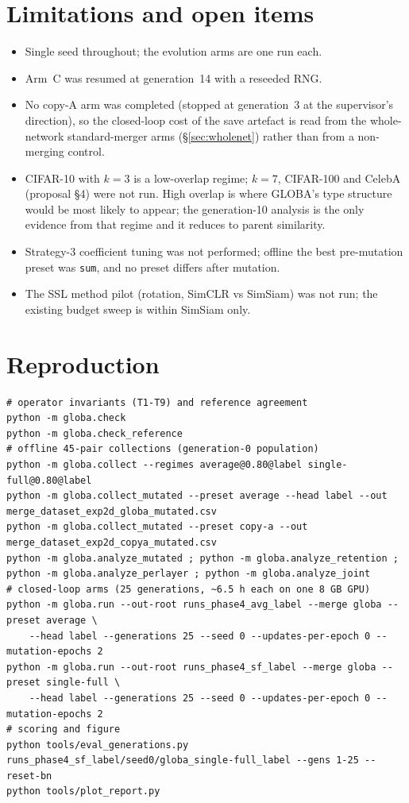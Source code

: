 \documentclass[11pt,a4paper]{article}
\newcommand{\code}[1]{\texttt{#1}}
\begin{document}
\section{Limitations and open items}
\begin{itemize}[nosep]
\item Single seed throughout; the evolution arms are one run each.
\item Arm~C was resumed at generation~14 with a reseeded RNG.
\item No copy-A arm was completed (stopped at generation~3 at the supervisor's direction), so the closed-loop cost of the save artefact is read from the whole-network standard-merger arms (\S\ref{sec:wholenet}) rather than from a non-merging control.
\item CIFAR-10 with $k=3$ is a low-overlap regime; $k=7$, CIFAR-100 and CelebA (proposal \S4) were not run. High overlap is where GLOBA's type structure would be most likely to appear; the generation-10 analysis is the only evidence from that regime and it reduces to parent similarity.
\item Strategy-3 coefficient tuning was not performed; offline the best pre-mutation preset was \code{sum}, and no preset differs after mutation.
\item The SSL method pilot (rotation, SimCLR vs SimSiam) was not run; the existing budget sweep is within SimSiam only.
\end{itemize}

\section{Reproduction}
\begin{lstlisting}
# operator invariants (T1-T9) and reference agreement
python -m globa.check
python -m globa.check_reference
# offline 45-pair collections (generation-0 population)
python -m globa.collect --regimes average@0.80@label single-full@0.80@label
python -m globa.collect_mutated --preset average --head label --out merge_dataset_exp2d_globa_mutated.csv
python -m globa.collect_mutated --preset copy-a --out merge_dataset_exp2d_copya_mutated.csv
python -m globa.analyze_mutated ; python -m globa.analyze_retention ; python -m globa.analyze_perlayer ; python -m globa.analyze_joint
# closed-loop arms (25 generations, ~6.5 h each on one 8 GB GPU)
python -m globa.run --out-root runs_phase4_avg_label --merge globa --preset average \
    --head label --generations 25 --seed 0 --updates-per-epoch 0 --mutation-epochs 2
python -m globa.run --out-root runs_phase4_sf_label --merge globa --preset single-full \
    --head label --generations 25 --seed 0 --updates-per-epoch 0 --mutation-epochs 2
# scoring and figure
python tools/eval_generations.py runs_phase4_sf_label/seed0/globa_single-full_label --gens 1-25 --reset-bn
python tools/plot_report.py
\end{lstlisting}
\end{document}
